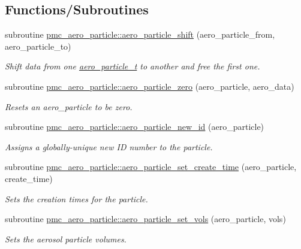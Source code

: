 \subsection*{Functions/\+Subroutines}
\begin{DoxyCompactItemize}
\item 
subroutine \mbox{\hyperlink{namespacepmc__aero__particle_a32b8b2f042b75f426babf6e12920f36c}{pmc\+\_\+aero\+\_\+particle\+::aero\+\_\+particle\+\_\+shift}} (aero\+\_\+particle\+\_\+from, aero\+\_\+particle\+\_\+to)
\begin{DoxyCompactList}\small\item\em Shift data from one \mbox{\hyperlink{structpmc__aero__particle_1_1aero__particle__t}{aero\+\_\+particle\+\_\+t}} to another and free the first one. \end{DoxyCompactList}\item 
subroutine \mbox{\hyperlink{namespacepmc__aero__particle_ae8b0ca357c00cbd9783ca52dcdf9e1ba}{pmc\+\_\+aero\+\_\+particle\+::aero\+\_\+particle\+\_\+zero}} (aero\+\_\+particle, aero\+\_\+data)
\begin{DoxyCompactList}\small\item\em Resets an aero\+\_\+particle to be zero. \end{DoxyCompactList}\item 
subroutine \mbox{\hyperlink{namespacepmc__aero__particle_ad693ed31a78df5bcc8df7bafaaeff5a0}{pmc\+\_\+aero\+\_\+particle\+::aero\+\_\+particle\+\_\+new\+\_\+id}} (aero\+\_\+particle)
\begin{DoxyCompactList}\small\item\em Assigns a globally-\/unique new ID number to the particle. \end{DoxyCompactList}\item 
subroutine \mbox{\hyperlink{namespacepmc__aero__particle_a11f426400953af4247cf3ff0ad05aedf}{pmc\+\_\+aero\+\_\+particle\+::aero\+\_\+particle\+\_\+set\+\_\+create\+\_\+time}} (aero\+\_\+particle, create\+\_\+time)
\begin{DoxyCompactList}\small\item\em Sets the creation times for the particle. \end{DoxyCompactList}\item 
subroutine \mbox{\hyperlink{namespacepmc__aero__particle_af4fbdf6ee50ec5fbaac1a10ea812cdc2}{pmc\+\_\+aero\+\_\+particle\+::aero\+\_\+particle\+\_\+set\+\_\+vols}} (aero\+\_\+particle, vols)
\begin{DoxyCompactList}\small\item\em Sets the aerosol particle volumes. \end{DoxyCompactList}\item 

\end{DoxyCompactItemize}
